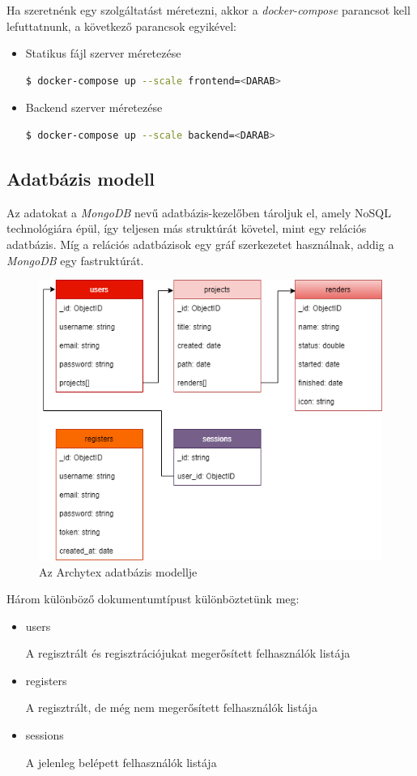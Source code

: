 Ha szeretnénk egy szolgáltatást méretezni, akkor a \emph{docker-compose} parancsot kell lefuttatnunk, a következő parancsok egyikével:

\begin{itemize}
  \item Statikus fájl szerver méretezése
        \begin{lstlisting}[language=bash]
        $ docker-compose up --scale frontend=<DARAB>\end{lstlisting}
  \item Backend szerver méretezése
        \begin{lstlisting}[language=bash]
        $ docker-compose up --scale backend=<DARAB>\end{lstlisting}
\end{itemize}

\subsection{Adatbázis modell}

Az adatokat a \emph{MongoDB} nevű adatbázis-kezelőben tároljuk el, amely NoSQL technológiára épül, így teljesen más struktúrát követel, mint egy relációs adatbázis. Míg a relációs adatbázisok egy gráf szerkezetet használnak, addig a \emph{MongoDB} egy fastruktúrát.

\begin{figure}[H]
  \centering
  \includegraphics[width=.7\textwidth]{parts/developer-documentation/backend/images/model.png}
  \caption{Az Archytex adatbázis modellje}
\end{figure}


Három különböző dokumentumtípust különböztetünk meg:
\begin{itemize}
  \item users

        A regisztrált és regisztrációjukat megerősített felhasználók listája
  \item registers

        A regisztrált, de még nem megerősített felhasználók listája
  \item sessions

        A jelenleg belépett felhasználók listája
\end{itemize}

